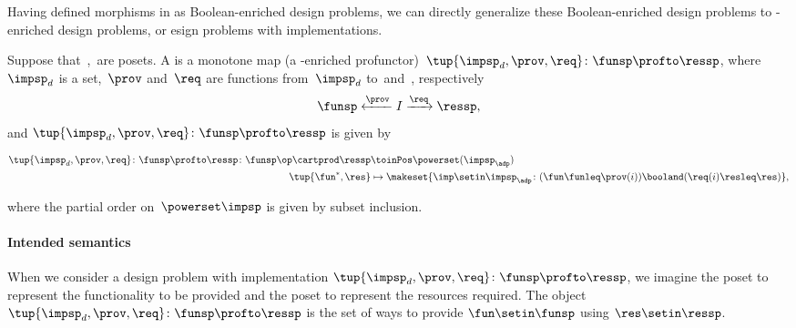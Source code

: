 {    Having defined morphisms in \DP as Boolean-enriched design problems, we can directly generalize these Boolean-enriched design problems to \Set-enriched design problems, or esign problems with implementations.
    \begin{widepar}
        \begin{definition}
            \label{def:dpwithimp}
            Suppose that~\funsp,~\ressp are posets.
            A \emph{} is a monotone map (a \Set-enriched profunctor)~$\tup{\impsp_d,\prov,\req}\colon \funsp\profto \ressp$, where~$\impsp_d$ is a set,~$\prov$ and~$\req$ are functions from~$\impsp_d$ to~\funsp and~\ressp, respectively
            \begin{equation}
                \funsp \xleftarrow{\prov} I \xrightarrow{\req} \ressp,
            \end{equation}
            and $\tup{\impsp_d,\prov,\req}\colon \funsp\profto \ressp$ is given by

            \begin{equation}
                \begin{aligned}
                    \tup{\impsp_d,\prov,\req}\colon \funsp\profto \ressp \colon \funsp\op \cartprod \ressp & \toinPos \powerset(\impsp_\adp) \\
                    \tup{\fun^*, \res}                                                                     & \mapsto \makeset{ \imp \setin \impsp_\adp \colon ( \fun \funleq \prov(i)) \booland (\req(i) \resleq \res) },
                \end{aligned}
            \end{equation}

            where the partial order on~$\powerset\impsp$ is given by subset inclusion.
        \end{definition}
    \end{widepar}

    \paragraph{Intended semantics}
    When we consider a design problem with implementation $\tup{\impsp_d, \prov, \req}\colon \funsp\profto \ressp$, we imagine the poset \funsp to represent the functionality to be provided and the poset \ressp to represent the resources required.
    The object $\tup{\impsp_d,\prov,\req}\colon \funsp\profto \ressp$ is the set of ways to provide $\fun\setin \funsp$ using $\res\setin \ressp$.

}
